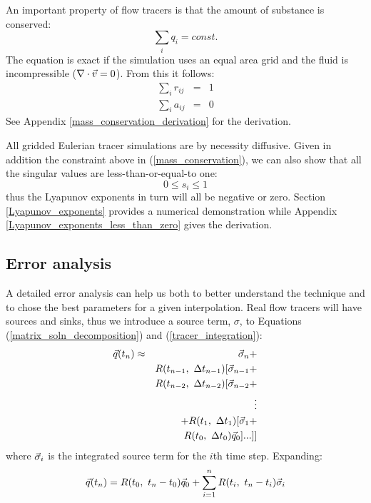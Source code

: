 An important property of flow tracers is that the amount of substance is 
conserved:
\begin{equation}
\sum_i q_i = const.
\label{mass_conservation}
\end{equation}
The equation is exact if the simulation uses an equal area grid
and the fluid is incompressible ($\nabla \cdot \vec v=0$).
From this it follows:
\begin{eqnarray}
\sum_i r_{ij} & = & 1 
\label{columns_sum_to_one}\\
\sum_i a_{ij} & = & 0
\label{columns_sum_to_zero}
\end{eqnarray}
See Appendix \ref{mass_conservation_derivation} for the derivation.

All gridded Eulerian tracer simulations are by necessity diffusive. 
Given in addition the constraint above in (\ref{mass_conservation}),
we can also show that all the singular values are less-than-or-equal-to one:
\begin{equation}
	0 \le s_i \le 1
	\label{sv_lt_one}
\end{equation}
thus the Lyapunov exponents in turn will all be negative or zero.
Section \ref{Lyapunov_exponents} provides a numerical demonstration while 
Appendix \ref{Lyapunov_exponents_less_than_zero} gives the derivation.

\subsection{Error analysis}

A detailed error analysis can help us both to better understand the technique
and to chose the best parameters for a given interpolation.
Real flow tracers will have sources and sinks, thus we introduce a source
term, $\sigma$, to Equations (\ref{matrix_soln_decomposition})
and (\ref{tracer_integration}):
\begin{eqnarray}
	  \vec q(t_n) 
  & \approx & \vec \sigma_{n} + \nonumber \\
  & & R(t_{n-1}, ~ \Delta t_{n-1}) [\vec \sigma_{n-1} + \nonumber \\
  & & R(t_{n-2}, ~ \Delta t_{n-2}) [\vec \sigma_{n-2} + \nonumber \\
  & & \vdots \nonumber \\
  & & + R(t_1, ~ \Delta t_1) [\vec \sigma_1 + \nonumber \\
  & & R(t_0, ~ \Delta t_0) \vec q_0 ]...]]
\end{eqnarray}
where $\vec \sigma_i$ is the integrated source term for the $i$th time step.
Expanding:
\begin{equation}
\vec q(t_n) 
   = R(t_0,~t_n-t_0) \vec q_0 + \sum_{i=1}^{n} R(t_i,~t_n-t_i) \vec \sigma_i
  \label{sources_sinks}
\end{equation}

